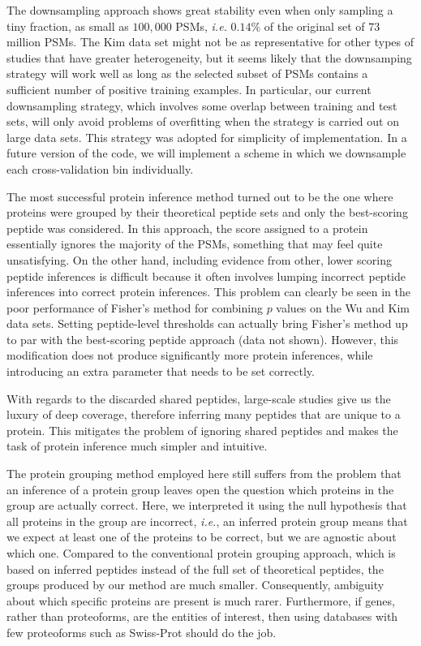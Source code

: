 \documentclass{article}
\begin{document}
The downsampling approach shows great stability even when only
sampling a tiny fraction, as small as $100,000$ PSMs, {\em i.e.}
$0.14\%$ of the original set of $73$ million PSMs.  The Kim data set
might not be as representative for other types of studies that have
greater heterogeneity, but it seems likely that the downsamping
strategy will work well as long as the selected subset of PSMs
contains a sufficient number of positive training examples. In
particular, our current downsampling strategy, which involves some
overlap between training and test sets, will only avoid problems of
overfitting when the strategy is carried out on large data sets. This
strategy was adopted for simplicity of implementation. In a future
version of the code, we will implement a scheme in which we downsample
each cross-validation bin individually.

The most successful protein inference method turned out to be the one
where proteins were grouped by their theoretical peptide sets and only
the best-scoring peptide was considered. In this approach, the score
assigned to a protein essentially ignores the majority of the PSMs,
something that may feel quite unsatisfying. On the other hand,
including evidence from other, lower scoring peptide inferences is
difficult because it often involves lumping incorrect peptide
inferences into correct protein inferences.  This problem can clearly
be seen in the poor performance of Fisher's method for combining $p$
values on the Wu and Kim data sets. Setting peptide-level thresholds
can actually bring Fisher's method up to par with the best-scoring
peptide approach (data not shown). However, this modification does not
produce significantly more protein inferences, while introducing an
extra parameter that needs to be set correctly.

With regards to the discarded shared peptides, large-scale studies
give us the luxury of deep coverage, therefore inferring many
peptides that are unique to a protein. This mitigates the problem of
ignoring shared peptides and makes the task of protein inference much
simpler and intuitive.  

The protein grouping method employed here still suffers from the
problem that an inference of a protein group leaves open the
question which proteins in the group are actually correct. Here, we
interpreted it using the null hypothesis that all proteins in the
group are incorrect, {\em i.e.}, an inferred protein group means
that we expect at least one of the proteins to be correct, but we are
agnostic about which one. Compared to the conventional protein
grouping approach, which is based on inferred peptides instead of
the full set of theoretical peptides, the groups produced by our
method are much smaller.  Consequently, ambiguity about which specific
proteins are present is much rarer.  Furthermore, if genes, rather
than proteoforms, are the entities of interest, then using databases
with few proteoforms such as Swiss-Prot should do the job.
\end{document}
